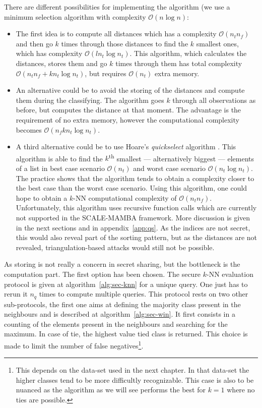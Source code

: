 There are different possibilities for implementing the algorithm (we use a minimum selection algorithm with complexity $\mathcal{O}(n\log n)$:
\begin{itemize}
    \item The first idea is to compute all distances which has a complexity $\mathcal{O}\left(n_tn_f\right)$ and then go $k$ times through those distances to find the $k$ smallest ones, which has complexity $\mathcal{O}\left(ln_t\log n_t\right)$. This algorithm, which calculates the distances, stores them and go $k$ times through them has total complexity $\mathcal{O}\left(n_tn_f+kn_t\log n_t \right)$, but requires $\mathcal{O}\left(n_t\right)$ extra memory.
    \item An alternative could be to avoid the storing of the distances and compute them during the classifying. The algorithm goes $k$ through all observations as before, but computes the distance at that moment. The advantage is the requirement of no extra memory, however the computational complexity becomes $\mathcal{O}\left(n_fkn_t \log n_t\right)$.
    \item A third alternative could be to use Hoare's \emph{quickselect} algorithm \cite{Hoare:1961:AF:366622.366647}. This algorithm is able to find the $k$\textsuperscript{th} smallest --- alternatively biggest --- elements of a list in best case scenario $\mathcal{O}\left(n_t\right)$ and worst case scenario $\mathcal{O}\left(n_t \log n_t\right)$. The practice shows that the algorithm tends to obtain a complexity closer to the best case than the worst case scenario. Using this algorithm, one could hope to obtain a $k$-NN computational complexity of $\mathcal{O}\left(n_tn_f\right)$. Unfortunately, this algorithm uses recursive function calls which are currently not supported in the SCALE-MAMBA framework. More discussion is given in the next sections and in appendix~\ref{app:qs}. As the indices are not secret, this would also reveal part of the sorting pattern, but as the distances are not revealed, triangulation-based attacks would still not be possible.
\end{itemize}
As storing is not really a concern in secret sharing, but the bottleneck is the computation part. The first option has been chosen. The secure $k$-NN evaluation protocol is given at algorithm~\ref{alg:sec-knn} for a unique query. One just has to rerun it $n_q$ times to compute multiple queries. This protocol rests on two other sub-protocols, the first one aims at defining the majority class present in the neighbours and is described at algorithm~\ref{alg:sec-win}. It first consists in a counting of the elements present in the neighbours and searching for the maximum. In case of tie, the highest value tied class is returned. This choice is made to limit the number of false negatives\footnote{This depends on the data-set used in the next chapter. In that data-set the higher classes tend to be more difficultly recognizable. This case is also to be nuanced as the algorithm as we will see performs the best for $k=1$ where no ties are possible.}.

